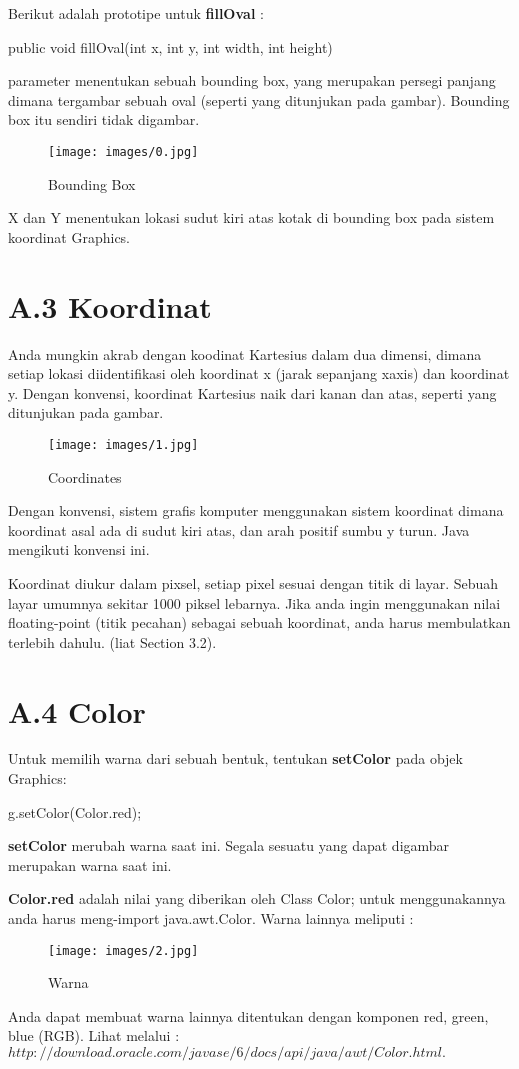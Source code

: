 Berikut adalah prototipe untuk \textbf{fillOval} :
\begin{list}
public void fillOval(int x, int y, int width, int height)
\end{list}
parameter menentukan sebuah bounding box, yang merupakan persegi panjang dimana tergambar sebuah oval (seperti yang ditunjukan pada gambar). Bounding box itu sendiri tidak digambar.
\begin{figure}[H]
	\centering \texttt{[image: images/0.jpg]}
	\caption{Bounding Box}
	\label{fig:binaryTreeRekursif}
\end{figure}
X dan Y menentukan lokasi sudut kiri atas kotak di bounding box pada sistem koordinat Graphics.

\section{A.3 Koordinat}
Anda mungkin akrab dengan koodinat Kartesius dalam dua dimensi, dimana setiap lokasi diidentifikasi oleh koordinat x (jarak sepanjang xaxis) dan koordinat y. Dengan konvensi, koordinat Kartesius naik dari kanan dan atas, seperti yang ditunjukan pada gambar.
\begin{figure}[H]
	\centering \texttt{[image: images/1.jpg]}
	\caption{Coordinates}
	\label{fig:binaryTreeRekursif}
\end{figure}

Dengan konvensi, sistem grafis komputer menggunakan sistem koordinat dimana koordinat asal ada di sudut kiri atas, dan arah positif sumbu y turun. Java mengikuti konvensi ini.

Koordinat diukur dalam pixsel, setiap pixel sesuai dengan titik di layar. Sebuah layar umumnya sekitar 1000 piksel lebarnya. Jika anda ingin menggunakan nilai floating-point (titik pecahan) sebagai sebuah koordinat, anda harus membulatkan terlebih dahulu. (liat Section 3.2).

\section{A.4 Color}
Untuk memilih warna dari sebuah bentuk,  tentukan \textbf{setColor} pada objek Graphics:

\begin{list}
	g.setColor(Color.red);
\end{list}

\textbf{setColor} merubah warna saat ini. Segala sesuatu yang dapat digambar merupakan warna saat ini.

\textbf{Color.red} adalah nilai yang diberikan oleh Class Color; untuk menggunakannya anda harus meng-import java.awt.Color. Warna lainnya meliputi :
\begin{figure}[H]
	\centering \texttt{[image: images/2.jpg]}
	\caption{Warna}
	\label{fig:binaryTreeRekursif}
\end{figure}
Anda dapat membuat warna lainnya ditentukan dengan komponen red, green, blue (RGB). Lihat melalui : $http://download.oracle.com/javase/6/docs/api/java/awt/Color.html.$

